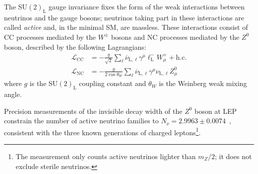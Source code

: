 The SU$(2)_\text{L}$ gauge invariance fixes the form of the weak interactions between neutrinos and the gauge bosons; neutrinos taking part in these interactions are called \textit{active} and, in the minimal \ac{SM}, are massless. These interactions consist of \ac{CC} processes mediated by the $W^\pm$ bosons and \ac{NC} processes mediated by the $Z^0$ boson, described by the following Lagrangians:
\begin{equation}
    \label{eq:SM-neutrino-lagrangian}
    \begin{aligned}
        \mathcal{L}_\text{CC} &= - \frac{g}{\sqrt{2}} \sum_{\ell} \overline{\nu}_{\text{L},\ell} \gamma^\mu \ell_\text{L}^- W_\mu^+ + \text{h.c.} \\
        \mathcal{L}_\text{NC} &= - \frac{g}{2 \cos \theta_W} \sum_{\ell} \overline{\nu}_{\text{L},\ell} \gamma^\mu \nu_{\text{L},\ell} Z_\mu^0
    \end{aligned}
\end{equation}
where $g$ is the SU$(2)_\text{L}$ coupling constant and $\theta_W$ is the Weinberg weak mixing angle. 

Precision measurements of the invisible decay width of the $Z^0$ boson at LEP constrain the number of active neutrino families to $N_\nu = 2.9963 \pm 0.0074$~\cite{JanotJadach2020}, consistent with the three known generations of charged leptons\footnote{The measurement only counts active neutrinos lighter than $m_Z/2$; it does not exclude sterile neutrinos.}.